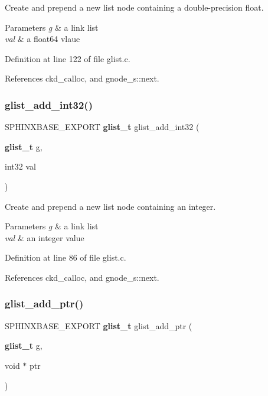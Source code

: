 Create and prepend a new list node containing a double-\/precision float. 


\begin{DoxyParams}{Parameters}
{\em g} & a link list \\
\hline
{\em val} & a float64 vlaue \\
\hline
\end{DoxyParams}


Definition at line 122 of file glist.\+c.



References ckd\+\_\+calloc, and gnode\+\_\+s\+::next.

\mbox{\label{glist_8h_a28adfcc24a784aaed1a0b3c4c4de4c42}} 
\subsubsection{glist\+\_\+add\+\_\+int32()}
{\footnotesize\ttfamily S\+P\+H\+I\+N\+X\+B\+A\+S\+E\+\_\+\+E\+X\+P\+O\+RT \textbf{ glist\+\_\+t} glist\+\_\+add\+\_\+int32 (\begin{DoxyParamCaption}\item[{\textbf{ glist\+\_\+t}}]{g,  }\item[{int32}]{val }\end{DoxyParamCaption})}



Create and prepend a new list node containing an integer. 


\begin{DoxyParams}{Parameters}
{\em g} & a link list \\
\hline
{\em val} & an integer value \\
\hline
\end{DoxyParams}


Definition at line 86 of file glist.\+c.



References ckd\+\_\+calloc, and gnode\+\_\+s\+::next.

\mbox{\label{glist_8h_a77a9c20b7df5a289477af405ab778377}} 
\subsubsection{glist\+\_\+add\+\_\+ptr()}
{\footnotesize\ttfamily S\+P\+H\+I\+N\+X\+B\+A\+S\+E\+\_\+\+E\+X\+P\+O\+RT \textbf{ glist\+\_\+t} glist\+\_\+add\+\_\+ptr (\begin{DoxyParamCaption}\item[{\textbf{ glist\+\_\+t}}]{g,  }\item[{void $\ast$}]{ptr }\end{DoxyParamCaption})}



